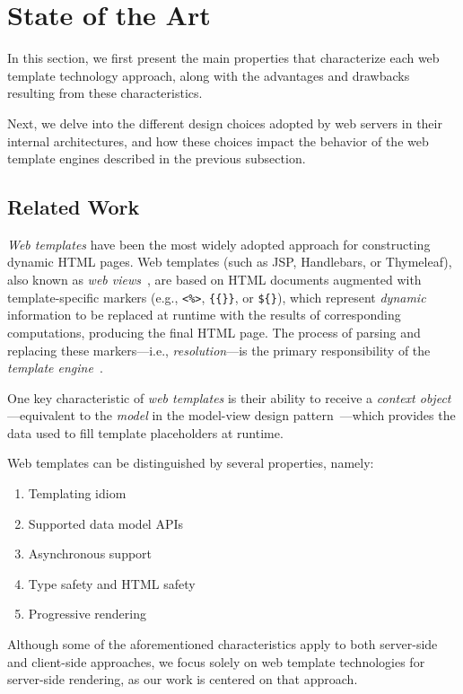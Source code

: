 \section{State of the Art}

In this section, we first present the main properties that characterize each web
template technology approach, along with the advantages and drawbacks resulting
from these characteristics.

Next, we delve into the different design choices adopted by web servers in their
internal architectures, and how these choices impact the behavior of the web
template engines described in the previous subsection.

\subsection{Related Work}

\textit{Web templates} have been the most widely adopted approach for
constructing dynamic HTML pages.
Web templates (such as JSP, Handlebars, or Thymeleaf), also known as
\textit{web views}~\cite{Fowler02,Alur01}, are based on
HTML documents augmented with template-specific markers (e.g., \texttt{<\%>},
\texttt{\{\{\}\}}, or \texttt{\$\{\}}), which represent \textit{dynamic}
information to be replaced at runtime with the results of corresponding
computations, producing the final HTML page.
The process of parsing and replacing these markers---i.e.,
\textit{resolution}---is the primary responsibility of the \textit{template
engine}~\cite{Parr04}.

One key characteristic of \textit{web templates} is their ability to receive a 
\textit{context object}---equivalent to the \textit{model} in the model-view 
design pattern~\cite{mvc88,Parr04}---which provides the data used to fill 
template placeholders at runtime.

Web templates can be distinguished by several properties, namely:
\begin{enumerate}
    \item Templating idiom
    \item Supported data model APIs
    \item Asynchronous support
    \item Type safety and HTML safety
    \item Progressive rendering
\end{enumerate}

Although some of the aforementioned characteristics apply to both server-side 
and client-side approaches, we focus solely on web template technologies for 
server-side rendering, as our work is centered on that approach.

